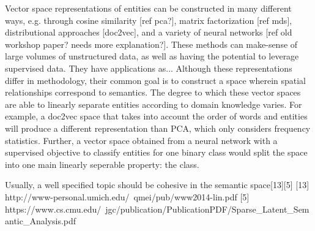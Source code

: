Vector space representations of entities can be constructed in many different ways, e.g. through cosine similarity [ref pca?], matrix factorization [ref mds], distributional approaches [doc2vec], and a variety of neural networks [ref old workshop paper? needs more explanation?]. These methods can make-sense of large volumes of unstructured data, %
as well as having the potential to leverage supervised data. %
They have applications as... %
Although these representations differ in methodology, their common goal is to construct a space wherein spatial relationships correspond to semantics. The degree to which these vector spaces are able to linearly separate entities according to domain knowledge varies. %
For example, a doc2vec space that takes into account the order of words and entities will produce a different representation than PCA, which only considers frequency statistics. Further, a vector space obtained from a neural network with a supervised objective to classify entities for one binary class would split the space into one main linearly seperable property: the class.


Usually, a well specified topic should be cohesive in the
semantic space[13][5] 
[13] http://www-personal.umich.edu/~qmei/pub/www2014-lin.pdf
[5] https://www.cs.cmu.edu/~jgc/publication/PublicationPDF/Sparse_Latent_Semantic_Analysis.pdf